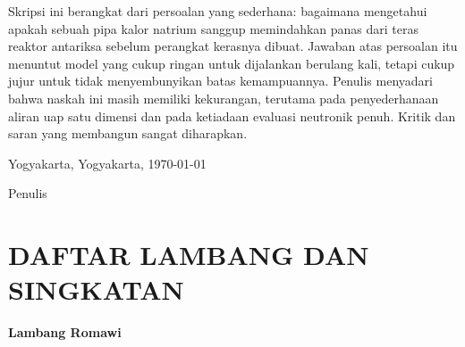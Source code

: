 \documentclass[
  indonesian,
  12pt,
  a4paper,
]{report}
\newcommand{\kotatanggal}{Yogyakarta, \today}
\renewcommand*\contentsname{Daftar Isi}
\newcommand\contentsname{Daftar Isi}
\renewcommand*\listfigurename{Daftar Gambar}
\newcommand\listfigurename{Daftar Gambar}
\renewcommand*\listtablename{Daftar Tabel}
\newcommand\listtablename{Daftar Tabel}
\begin{document}
Skripsi ini berangkat dari persoalan yang sederhana: bagaimana
mengetahui apakah sebuah pipa kalor natrium sanggup memindahkan panas
dari teras reaktor antariksa sebelum perangkat kerasnya dibuat. Jawaban
atas persoalan itu menuntut model yang cukup ringan untuk dijalankan
berulang kali, tetapi cukup jujur untuk tidak menyembunyikan batas
kemampuannya. Penulis menyadari bahwa naskah ini masih memiliki
kekurangan, terutama pada penyederhanaan aliran uap satu dimensi dan
pada ketiadaan evaluasi neutronik penuh. Kritik dan saran yang membangun
sangat diharapkan.

Yogyakarta, \kotatanggal

Penulis

\begin{singlespace}
\renewcommand{\contentsname}{DAFTAR ISI}
\tableofcontents
\clearpage

\renewcommand{\listtablename}{DAFTAR TABEL}
\listoftables
\clearpage

\renewcommand{\listfigurename}{DAFTAR GAMBAR}
\listoffigures
\clearpage
\end{singlespace}

\chapter*{DAFTAR LAMBANG DAN
SINGKATAN}\label{daftar-lambang-dan-singkatan}

\textbf{Lambang Romawi}
\end{document}
